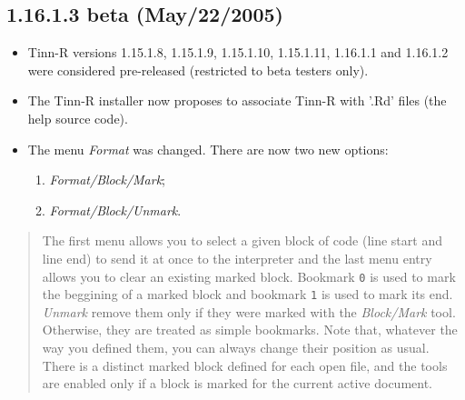 \subsection{1.16.1.3 beta (May/22/2005)}

\begin{itemize}
  \item Tinn-R versions 1.15.1.8, 1.15.1.9, 1.15.1.10, 1.15.1.11, 1.16.1.1
    and 1.16.1.2 were considered pre-released (restricted to beta
    testers only).
  \item The Tinn-R installer now proposes to associate Tinn-R with '.Rd'
    files (the \RR{} help source code).
  \item The menu \textit{Format} was changed. There are now two new
    options:
    \begin{enumerate}
      \item \textit{Format/Block/Mark};
      \item \textit{Format/Block/Unmark}.
    \end{enumerate}
\end{itemize}

\begin{footnotesize}
  \begin{quotation}
    The first menu allows you to select a given block of code (line start and
    line end) to send it at once to the \RR{} interpreter and the last menu
    entry allows you to clear an existing marked block.
    Bookmark \texttt{0} is used to mark the beggining of a marked block and
    bookmark \texttt{1} is used to mark its end. \textit{Unmark} remove them
    only if they were marked with the \textit{Block/Mark} tool. Otherwise, they
    are treated as simple bookmarks. Note that, whatever the way you defined
    them, you can always change their position as usual.
    There is a distinct marked block defined for each open file, and the tools
    are enabled only if a block is marked for the current active document.
  \end{quotation}
\end{footnotesize}

